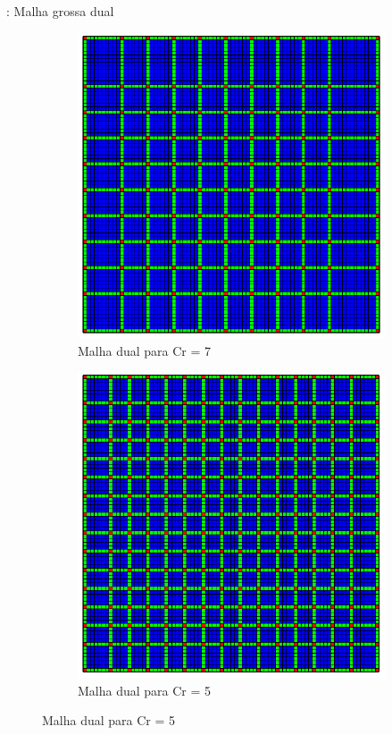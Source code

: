 \documentclass[professionalfont]{beamer}
\begin{document}
\begin{frame}{\FrameProblemName: {\small Malha grossa dual}}
    \begin{figure}
        \centering
        \begin{subfigure}{.48\textwidth}
            \centering
            \includegraphics[scale=0.25]{imgs/dual_pr4_cr7.png}
            \caption{Malha dual para Cr = 7}
        \end{subfigure}
        \hspace{\fill}
        \begin{subfigure}{.48\textwidth}
            \centering
            \includegraphics[scale=0.25]{imgs/dual_pr4_cr5.png}
            \caption{Malha dual para Cr = 5}
        \end{subfigure}
    \end{figure}
\end{frame}
\end{document}
